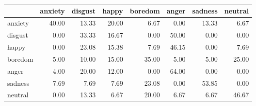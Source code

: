 \begin{tabular}{lrrrrrrr}
\toprule
{} &  anxiety &  disgust &  happy &  boredom &  anger &  sadness &  neutral \\
\midrule
anxiety &    40.00 &    13.33 &  20.00 &     6.67 &   0.00 &    13.33 &     6.67 \\
disgust &     0.00 &    33.33 &  16.67 &     0.00 &  50.00 &     0.00 &     0.00 \\
happy   &     0.00 &    23.08 &  15.38 &     7.69 &  46.15 &     0.00 &     7.69 \\
boredom &     5.00 &    10.00 &  15.00 &    35.00 &   5.00 &     5.00 &    25.00 \\
anger   &     4.00 &    20.00 &  12.00 &     0.00 &  64.00 &     0.00 &     0.00 \\
sadness &     7.69 &     7.69 &   7.69 &    23.08 &   0.00 &    53.85 &     0.00 \\
neutral &     0.00 &    13.33 &   6.67 &    20.00 &   6.67 &     6.67 &    46.67 \\
\bottomrule
\end{tabular}

